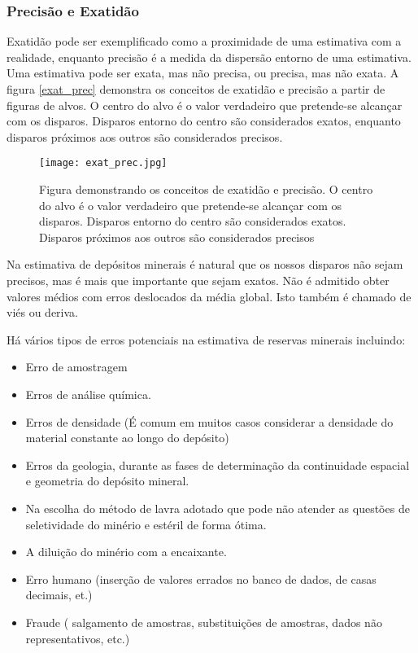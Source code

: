 	\subsubsection{Precisão e Exatidão}
	
	Exatidão pode ser exemplificado como a proximidade de uma estimativa com a realidade, enquanto precisão é a medida da dispersão entorno de uma estimativa. Uma estimativa pode ser exata, mas não precisa, ou precisa, mas não exata. A figura \eqref{exat_prec} demonstra os conceitos de exatidão e precisão a partir de figuras de alvos. O centro do alvo é o valor verdadeiro que pretende-se alcançar com os disparos. Disparos entorno do centro são considerados exatos, enquanto disparos próximos aos outros são considerados precisos. 
	
	\begin{figure}[H]
		\centering
		\texttt{[image: exat\_prec.jpg]}	
		\caption{Figura demonstrando os conceitos de exatidão e precisão. O centro do alvo é o valor verdadeiro que pretende-se alcançar com os disparos. Disparos entorno do centro são considerados exatos. Disparos próximos aos outros são considerados precisos }
		\label{exat_prec}
	\end{figure}
	
	Na estimativa de depósitos minerais é natural que os nossos disparos não sejam precisos, mas é mais que importante que sejam exatos. Não é admitido obter valores médios com erros deslocados da média global. Isto também é chamado de viés ou deriva. 
	
	Há vários tipos de erros potenciais na estimativa de reservas minerais incluindo:
	
	\begin{itemize}
		\item Erro de amostragem 
		\item Erros de análise química.
		\item Erros de densidade (É comum em muitos casos considerar a densidade do material constante ao longo do depósito)
		\item Erros da geologia, durante as fases de determinação da continuidade espacial e geometria do depósito mineral.
		\item Na escolha do método de lavra adotado que pode não atender as questões de seletividade do minério e estéril de forma ótima.
		\item A diluição do minério com a encaixante.
		\item Erro humano (inserção de valores errados no banco de dados, de casas decimais, et.)
		\item Fraude ( salgamento de amostras, substituições de amostras, dados não representativos, etc.)
		
	\end{itemize}
	
		
	